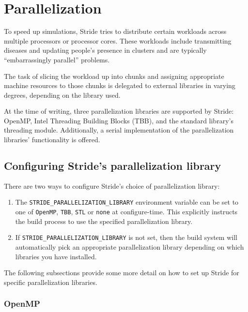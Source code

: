   
\chapter{Parallelization}

To speed up simulations, Stride tries to distribute certain workloads across multiple processors or processor cores. These workloads include transmitting diseases and updating people's presence in clusters and are typically ``embarrassingly parallel'' problems.

The task of slicing the workload up into chunks and assigning appropriate machine resources to those chunks is delegated to external libraries in varying degrees, depending on the library used.

At the time of writing, three parallelization libraries are supported by Stride: OpenMP, Intel Threading Building Blocks (TBB), and the standard library's threading module. Additionally, a serial implementation of the parallelization libraries' functionality is offered.

\section{Configuring Stride's parallelization library}

There are two ways to configure Stride's choice of parallelization library:

\begin{enumerate}
	\item The \texttt{STRIDE\_PARALLELIZATION\_LIBRARY} environment variable can be set to one of \texttt{OpenMP}, \texttt{TBB}, \texttt{STL} or \texttt{none} at configure-time. This explicitly instructs the build process to use the specified parallelization library.
	
	\item If \texttt{STRIDE\_PARALLELIZATION\_LIBRARY} is not set, then the build system will automatically pick an appropriate parallelization library depending on which libraries you have installed.
\end{enumerate}

The following subsections provide some more detail on how to set up Stride for specific parallelization libraries.

\subsection{OpenMP}

